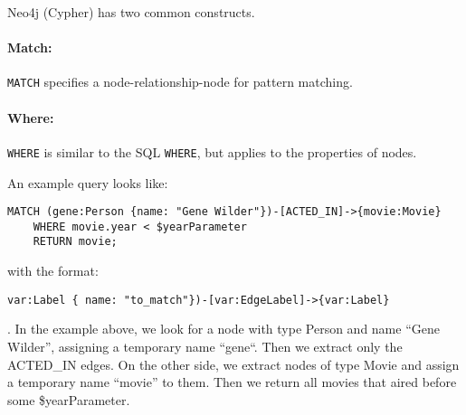 \documentclass{report}
\newenvironment{example}{\begin{tcolorbox}[title={Example},colback=green!5!white,colframe=black!75!green]}{\end{tcolorbox}}
\renewcommand{\tt}[1]{\texttt{{#1}}}
\begin{document}
Neo4j (Cypher) has two common constructs.

\paragraph{Match:} \tt{MATCH} specifies a node-relationship-node for pattern
matching.

\paragraph{Where:} \tt{WHERE} is similar to the SQL \tt{WHERE}, but applies to
the properties of nodes.

\begin{example}
    An example query looks like:
\begin{lstlisting}[language=Cypher, style=colorEX]
    MATCH (gene:Person {name: "Gene Wilder"})-[ACTED_IN]->{movie:Movie}
    WHERE movie.year < $yearParameter
    RETURN movie;
\end{lstlisting}
with the format:
\begin{BVerbatim}
var:Label { name: "to_match"})-[var:EdgeLabel]->{var:Label}
\end{BVerbatim}
. In the example above, we look for a node with type Person and name
``Gene Wilder'', assigning a temporary name ``gene``. Then we extract only the
ACTED\_IN edges. On the other side, we extract nodes of type Movie and assign a
temporary name ``movie'' to them. Then we return all movies that aired before some
\$yearParameter.
\end{example}
\end{document}
